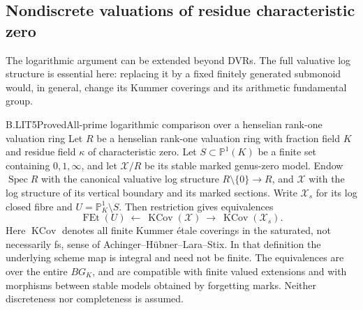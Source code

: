 \subsection{Nondiscrete valuations of residue characteristic zero}

The logarithmic argument can be extended beyond DVRs. The full
valuative log structure is essential here: replacing it by a fixed
finitely generated submonoid would, in general, change its Kummer
coverings and its arithmetic fundamental group.

\begin{claim}{B.LIT5}{Proved}{All-prime logarithmic comparison over a henselian rank-one valuation ring}
Let $R$ be a henselian rank-one valuation ring with fraction field $K$
and residue field $\kappa$ of characteristic zero. Let
$S\subset\mathbb P^1(K)$ be a finite set containing $0,1,\infty$,
and let $\mathscr X/R$ be its stable marked genus-zero model.
Endow $\operatorname{Spec}R$ with the canonical valuative log
structure $R\setminus\{0\}\to R$, and $\mathscr X$ with the
log structure of its vertical boundary and its marked sections.
Write $\mathscr X_s$ for its log closed fibre and
$U=\mathbb P^1_K\setminus S$. Then restriction gives equivalences
\[
 \operatorname{FEt}(U)
 \ \longleftarrow\
 \operatorname{KCov}(\mathscr X)
 \ \longrightarrow\
 \operatorname{KCov}(\mathscr X_s).                 \tag{B.LIT.1}
\]
Here $\operatorname{KCov}$ denotes all finite Kummer \'etale
coverings in the saturated, not necessarily fs, sense of
Achinger--H\"ubner--Lara--Stix. In that definition the underlying
scheme map is integral and need not be finite. The equivalences
are over the entire $BG_K$, and are compatible with finite valued
extensions and with morphisms between stable models obtained by
forgetting marks. Neither discreteness nor completeness is assumed.
\end{claim}
